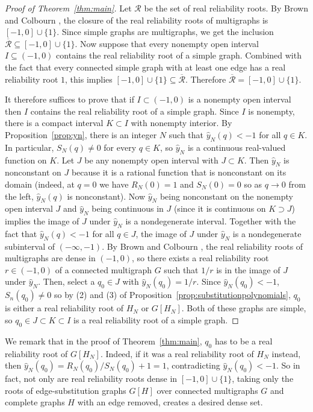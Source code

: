 \documentclass[12pt]{amsart}
\theoremstyle{definition}
\begin{document}
\begin{proof}[Proof of Theorem~\ref{thm:main}]
Let $\mathcal{R}$ be the set of real reliability roots. By Brown and Colbourn \cite{BrownColbourn1992}, the closure of the real reliability roots of multigraphs is $[-1,0]\cup\{1\}$. Since simple graphs are multigraphs, we get the inclusion $\overline{\mathcal{R}} \subseteq [-1,0] \cup \{1\}$. Now suppose that  every nonempty open interval $I \subseteq (-1,0)$ contains the real reliability root of a simple graph. Combined with the fact that every connected simple graph with at least one edge has a real reliability root $1$, this implies $[-1,0] \cup \{1\} \subseteq \overline{\mathcal{R}}$. Therefore $\overline{\mathcal{R}}=[-1,0] \cup \{1\}$.

It therefore suffices to prove that if $I \subset (-1,0)$ is a nonempty open interval then $I$ contains the real reliability root of a simple graph. Since $I$ is nonempty, there is a compact interval $K \subset I$ with nonempty interior. By Proposition~\ref{prop:yn}, there is an integer $N$ such that $\hat{y}_N(q)<-1$ for all $q \in K$. In particular, $S_N(q) \neq 0$ for every $q \in K$, so $\hat{y}_N$ is a continuous real-valued function on $K$. Let $J$ be any nonempty open interval with $J \subset K$. Then $\hat{y}_N$ is nonconstant on $J$ because it is a rational function that is nonconstant on its domain (indeed, at $q=0$ we have $R_N(0)=1$ and $S_N(0)=0$ so as $q \to 0$ from the left, $\hat{y}_N(q)$ is nonconstant). Now $\hat{y}_N$ being nonconstant on the nonempty open interval $J$ and $\hat{y}_N$ being continuous in $J$ (since it is continuous on $K \supset J$) implies the image of $J$ under $\hat{y}_N$ is a nondegenerate interval. Together with the fact that $\hat{y}_N(q)<-1$ for all $q \in J$, the image of $J$ under $\hat{y}_N$ is a nondegenerate subinterval of $(-\infty,-1)$. By Brown and Colbourn \cite{BrownColbourn1992}, the real reliability roots of multigraphs are dense in $(-1,0)$, so there exists a real reliability root $r \in (-1,0)$ of a connected multigraph $G$ such that $1/r$ is in the image of $J$ under $\hat{y}_N$. Then, select a $q_0 \in J$ with $\hat{y}_N(q_0)=1/r$. Since $\hat{y}_N(q_0)<-1$, $S_n(q_0) \neq 0$ so by (2) and (3) of Proposition~\ref{prop:substitutionpolynomials}, $q_0$ is either a real reliability root of $H_N$ or $G[H_N]$. Both of these graphs are simple, so $q_0 \in J \subset K \subset I$ is a real reliability root of a simple graph.
\end{proof}
We remark that in the proof of Theorem~\ref{thm:main}, $q_0$ has to be a real reliability root of $G[H_N]$. Indeed, if it was a real reliability root of $H_N$ instead, then $\hat{y}_N(q_0)=R_N(q_0)/S_N(q_0)+1=1$, contradicting $\hat{y}_N(q_0)<-1$. So in fact, not only are real reliability roots dense in $[-1,0] \cup \{1\}$, taking only the roots of edge-substitution graphs $G[H]$ over connected multigraphs $G$ and complete graphs $H$ with an edge removed, creates a desired dense set.
\end{document}
